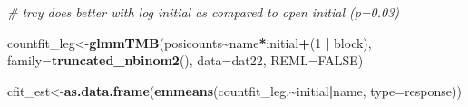 \documentclass[
]{article}
\newenvironment{Shaded}{\begin{snugshade}}{\end{snugshade}}
\newcommand{\AttributeTok}[1]{\textcolor[rgb]{0.13,0.29,0.53}{#1}}
\newcommand{\CommentTok}[1]{\textcolor[rgb]{0.56,0.35,0.01}{\textit{#1}}}
\newcommand{\ConstantTok}[1]{\textcolor[rgb]{0.56,0.35,0.01}{#1}}
\newcommand{\DecValTok}[1]{\textcolor[rgb]{0.00,0.00,0.81}{#1}}
\newcommand{\FunctionTok}[1]{\textcolor[rgb]{0.13,0.29,0.53}{\textbf{#1}}}
\newcommand{\NormalTok}[1]{#1}
\newcommand{\OtherTok}[1]{\textcolor[rgb]{0.56,0.35,0.01}{#1}}
\newcommand{\SpecialCharTok}[1]{\textcolor[rgb]{0.81,0.36,0.00}{\textbf{#1}}}
\newcommand{\StringTok}[1]{\textcolor[rgb]{0.31,0.60,0.02}{#1}}
\begin{document}
\begin{Shaded}
\begin{Highlighting}[]
\CommentTok{\# trcy does better with log initial as compared to open initial (p=0.03)}

\NormalTok{ countfit\_leg}\OtherTok{\textless{}{-}}\FunctionTok{glmmTMB}\NormalTok{(posicounts}\SpecialCharTok{\textasciitilde{}}\NormalTok{name}\SpecialCharTok{*}\NormalTok{initial}\SpecialCharTok{+}\NormalTok{(}\DecValTok{1} \SpecialCharTok{|}\NormalTok{ block), }\AttributeTok{family=}\FunctionTok{truncated\_nbinom2}\NormalTok{(), }\AttributeTok{data=}\NormalTok{dat22, }\AttributeTok{REML=}\ConstantTok{FALSE}\NormalTok{)}

\NormalTok{cfit\_est}\OtherTok{\textless{}{-}}\FunctionTok{as.data.frame}\NormalTok{(}\FunctionTok{emmeans}\NormalTok{(countfit\_leg,}\SpecialCharTok{\textasciitilde{}}\NormalTok{initial}\SpecialCharTok{|}\NormalTok{name, }\AttributeTok{type=}\StringTok{\textquotesingle{}response\textquotesingle{}}\NormalTok{))}


\end{Highlighting}
\end{Shaded}
\end{document}
